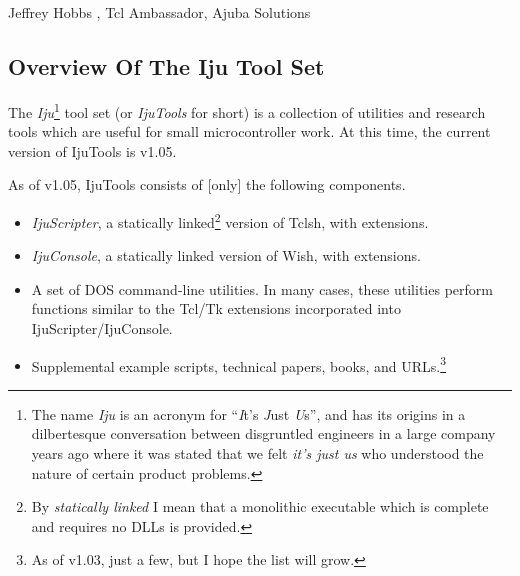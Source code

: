 
\chapter[\ctinzeroshorttitle{}]{\ctinzerolongtitle{}}

\label{ctin0}

                   {Jeffrey Hobbs \cite{bibref:i:jeffreyhobbs}, Tcl Ambassador, Ajuba Solutions}


\section{Overview Of The Iju Tool Set}
The \emph{Iju}\footnote{The name \emph{Iju} is an acronym for
``\emph{I}t's \emph{J}ust \emph{U}s'', and has its origins in
a dilbertesque conversation between disgruntled engineers 
in a large company years ago where it
was stated that we felt \emph{it's just us} who understood
the nature of certain product problems.} tool set (or \emph{IjuTools} for short) 
is a collection of utilities and research tools which are
useful for small microcontroller work.  At this time, the current version of 
IjuTools is v1.05.

As of v1.05, IjuTools consists of [only] the following components.

\begin{itemize}
\item \emph{IjuScripter}, a statically linked\footnote{By \emph{statically linked}
      I mean that a monolithic executable which is complete and requires no
      DLLs is provided.} version of Tclsh, with extensions.

\item \emph{IjuConsole}, a statically linked version of Wish, with extensions.

\item A set of DOS command-line utilities.  In many cases, these utilities
      perform functions similar to the Tcl/Tk extensions incorporated into
	  IjuScripter/IjuConsole.
\item Supplemental example scripts, technical papers, books, and URLs.\footnote{As
      of v1.03, just a few, but I hope the list will grow.}
\end{itemize}

